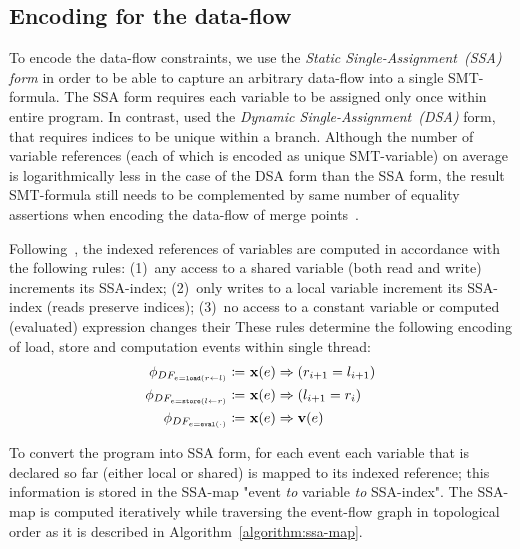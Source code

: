 \subsection{Encoding for the data-flow}
\label{ch:enc:enc:df}

To encode the data-flow constraints, we use the \textit{Static Single-Assignment~(SSA) form} in order to be able to capture an arbitrary data-flow into a single SMT-formula.
The SSA form requires each variable to be assigned only once within entire program.
In contrast, \porthos{} used the \textit{Dynamic Single-Assignment~(DSA)} form, that requires indices to be unique within a branch.
Although the number of variable references (each of which is encoded as unique SMT-variable) on average is logarithmically less in the case of the DSA form than the SSA form, the result SMT-formula still needs to be complemented by same number of equality assertions when encoding the data-flow of merge points~\cite{Porthos17a}.

Following~\cite{Porthos17b}, the indexed references of variables are computed in accordance with the following rules:
(1)~any access to a shared variable (both read and write) increments its SSA-index;
(2)~only writes to a local variable increment its SSA-index (reads preserve indices);
(3)~no access to a constant variable or computed (evaluated) expression changes their %
These rules determine the following encoding of load, store and computation events within single thread:
%
\begin{align}
    \phi_{DF_{e = \texttt{load}(r \leftarrow l)}} \defeq \ & \fx(e) \Rightarrow (r_{i+1} = l_{i+1}) \\
    \phi_{DF_{e = \texttt{store}(l \leftarrow r)}} \defeq \ & \fx(e) \Rightarrow (l_{i+1} = r_i) \\
    \phi_{DF_{e = \texttt{eval}(\cdot)}} \defeq \ & \fx(e) \Rightarrow \fv(e) %
\end{align}

To convert the program into SSA form, for each event each variable that is declared so far (either local or shared) is mapped to its indexed reference; this information is stored in the SSA-map "event \textit{to} variable \textit{to} SSA-index". %
The SSA-map is computed iteratively while traversing the event-flow graph in topological order as it is described in Algorithm~\ref{algorithm:ssa-map}.

